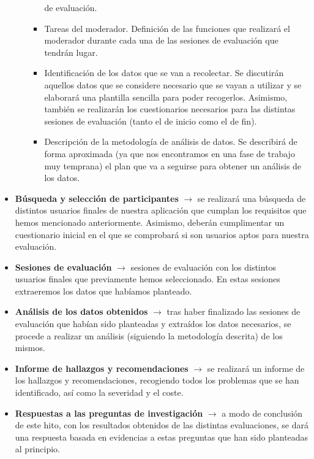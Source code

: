 \begin{itemize}
\begin{itemize}
\begin{itemize}
            de evaluación.
            \item Tareas del moderador. Definición de las funciones que realizará el moderador durante cada una de las sesiones de evaluación que tendrán lugar.
            \item Identificación de los datos que se van a recolectar. Se discutirán aquellos datos que se considere necesario que se vayan a utilizar y se elaborará una
            plantilla sencilla para poder recogerlos. Asimismo, también se realizarán los cuestionarios necesarios para las distintas sesiones de evaluación (tanto el de inicio como
            el de fin).
            \item Descripción de la metodología de análisis de datos. Se describirá de forma aproximada (ya que nos encontramos en una fase de trabajo muy temprana) el plan que
            va a seguirse para obtener un análisis de los datos.
        \end{itemize}
    \end{itemize}
    \item \textbf{Búsqueda y selección de participantes} $\rightarrow$ se realizará una búsqueda de distintos usuarios finales de nuestra aplicación que cumplan los requisitos que hemos
    mencionado anteriormente. Asimismo, deberán cumplimentar un cuestionario inicial en el que se comprobará si son usuarios aptos para nuestra evaluación.
    \item \textbf{Sesiones de evaluación} $\rightarrow$ sesiones de evaluación con los distintos usuarios finales que previamente hemos seleccionado. En estas sesiones extraeremos
    los datos que habíamos planteado.
    \item \textbf{Análisis de los datos obtenidos} $\rightarrow$ tras haber finalizado las sesiones de evaluación que habían sido planteadas y extraídos los datos necesarios, se procede a
    realizar un análisis (siguiendo la metodología descrita) de los mismos.
    \item \textbf{Informe de hallazgos y recomendaciones} $\rightarrow$ se realizará un informe de los hallazgos y recomendaciones, recogiendo todos los problemas que se han identificado, así
    como la severidad y el coste.
    \item \textbf{Respuestas a las preguntas de investigación} $\rightarrow$ a modo de conclusión de este hito, con los resultados obtenidos de las distintas evaluaciones, se dará una respuesta
    basada en evidencias a estas preguntas que han sido planteadas al principio.
\end{itemize}